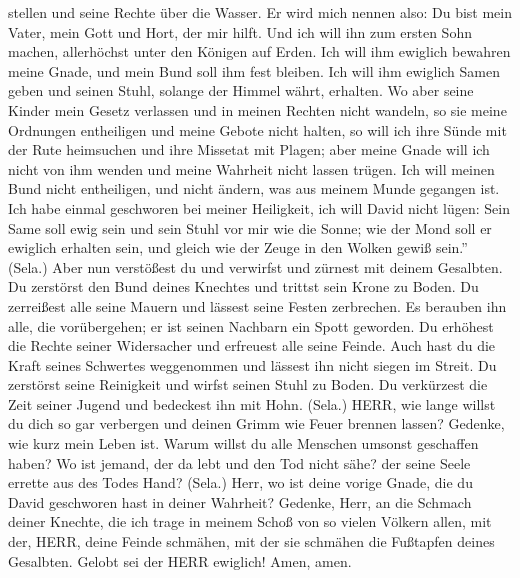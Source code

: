 stellen und seine Rechte über die Wasser.  Er wird mich
nennen also: Du bist mein Vater, mein Gott und Hort, der mir hilft.
 Und ich will ihn zum ersten Sohn machen, allerhöchst unter
den Königen auf Erden.  Ich will ihm ewiglich bewahren
meine Gnade, und mein Bund soll ihm fest bleiben.  Ich will
ihm ewiglich Samen geben und seinen Stuhl, solange der Himmel währt,
erhalten.  Wo aber seine Kinder mein Gesetz verlassen und
in meinen Rechten nicht wandeln,  so sie meine Ordnungen
entheiligen und meine Gebote nicht halten,  so will ich
ihre Sünde mit der Rute heimsuchen und ihre Missetat mit Plagen;
 aber meine Gnade will ich nicht von ihm wenden und meine
Wahrheit nicht lassen trügen.  Ich will meinen Bund nicht
entheiligen, und nicht ändern, was aus meinem Munde gegangen ist.
 Ich habe einmal geschworen bei meiner Heiligkeit, ich will
David nicht lügen:  Sein Same soll ewig sein und sein Stuhl
vor mir wie die Sonne;  wie der Mond soll er ewiglich
erhalten sein, und gleich wie der Zeuge in den Wolken gewiß sein.''
(Sela.)  Aber nun verstößest du und verwirfst und zürnest
mit deinem Gesalbten.  Du zerstörst den Bund deines
Knechtes und trittst sein Krone zu Boden.  Du zerreißest
alle seine Mauern und lässest seine Festen zerbrechen.  Es
berauben ihn alle, die vorübergehen; er ist seinen Nachbarn ein Spott
geworden.  Du erhöhest die Rechte seiner Widersacher und
erfreuest alle seine Feinde.  Auch hast du die Kraft seines
Schwertes weggenommen und lässest ihn nicht siegen im Streit.
 Du zerstörst seine Reinigkeit und wirfst seinen Stuhl zu
Boden.  Du verkürzest die Zeit seiner Jugend und bedeckest
ihn mit Hohn. (Sela.)  HERR, wie lange willst du dich so
gar verbergen und deinen Grimm wie Feuer brennen lassen? 
Gedenke, wie kurz mein Leben ist. Warum willst du alle Menschen umsonst
geschaffen haben?  Wo ist jemand, der da lebt und den Tod
nicht sähe? der seine Seele errette aus des Todes Hand? (Sela.)
 Herr, wo ist deine vorige Gnade, die du David geschworen
hast in deiner Wahrheit?  Gedenke, Herr, an die Schmach
deiner Knechte, die ich trage in meinem Schoß von so vielen Völkern
allen,  mit der, HERR, deine Feinde schmähen, mit der sie
schmähen die Fußtapfen deines Gesalbten.  Gelobt sei der
HERR ewiglich! Amen, amen.

